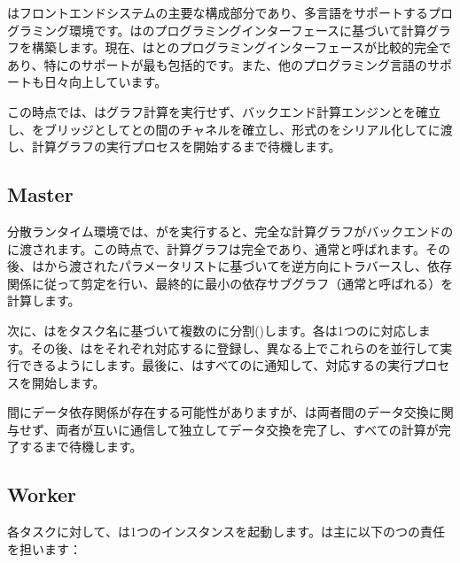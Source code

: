 \begin{content}
はフロントエンドシステムの主要な構成部分であり、多言語をサポートするプログラミング環境です。はのプログラミングインターフェースに基づいて計算グラフを構築します。現在、はとのプログラミングインターフェースが比較的完全であり、特にのサポートが最も包括的です。また、他のプログラミング言語のサポートも日々向上しています。

この時点では、はグラフ計算を実行せず、バックエンド計算エンジンとを確立し、をブリッジとしてとの間のチャネルを確立し、形式のをシリアル化してに渡し、計算グラフの実行プロセスを開始するまで待機します。

\subsection{Master}

分散ランタイム環境では、がを実行すると、完全な計算グラフがバックエンドのに渡されます。この時点で、計算グラフは完全であり、通常\emph{}と呼ばれます。その後、はから渡されたパラメータリストに基づいてを逆方向にトラバースし、依存関係に従って剪定を行い、最終的に最小の依存サブグラフ（通常と呼ばれる）を計算します。

次に、はをタスク名に基づいて複数のに分割()します。各は1つのに対応します。その後、はをそれぞれ対応するに登録し、異なる上でこれらのを並行して実行できるようにします。最後に、はすべてのに通知して、対応するの実行プロセスを開始します。

間にデータ依存関係が存在する可能性がありますが、は両者間のデータ交換に関与せず、両者が互いに通信して独立してデータ交換を完了し、すべての計算が完了するまで待機します。

\subsection{Worker}

各タスクに対して、\tf{}は1つのインスタンスを起動します。は主に以下のつの責任を担います：


\end{content}
